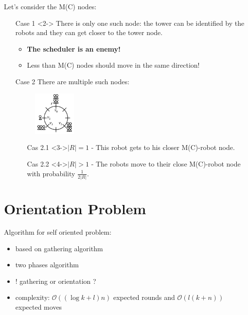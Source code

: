 \documentclass{beamer}
\begin{document}
\begin{frame}

	Let's consider the M(C) nodes:
	\begin{itemize}
		\item[Case 1]<2-> There is only one such node: the tower can be identified by the robots and they can get closer to the tower node.
		\begin{itemize}
			\item<3-> \textbf{The scheduler is an enemy!}
			\item<3-> Less than M(C) nodes should move in the same direction! 
		\end{itemize}
	\end{itemize}

\end{frame}

\begin{frame}
	\begin{itemize}
		\item[Case 2] There are multiple such nodes:
			\begin{figure}[h]
   				\includegraphics[width=0.2\textwidth]{images/random_configuration.png}
			\end{figure}
			\begin{itemize}
				\item[Cas 2.1]<3->$|R| = 1$ - This robot gets to his closer M(C)-robot node. 
				\item[Cas 2.2]<4->$|R| > 1$ - The robots move to their close M(C)-robot node with probability $\frac{1}{2|R|}$.
			\end{itemize}
	\end{itemize}
\end{frame}





\section{Orientation Problem}
\begin{frame}
	Algorithm for self oriented problem:
	\begin{itemize}
		\item based on gathering algorithm
		\pause
		\item two phases algorithm
		\pause
		\item ! gathering or orientation ?
		\pause
		\item complexity: $\mathcal{O}((\log{k} + l)n)$ expected rounds 
		and $\mathcal{O}(l(k+n))$ expected moves
	\end{itemize}
\end{frame}
\end{document}
